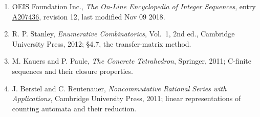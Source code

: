 \documentclass[11pt]{article}
\theoremstyle{definition}
\begin{document}
\begin{enumerate}

\item OEIS Foundation Inc., \emph{The On-Line Encyclopedia of Integer Sequences}, entry \href{https://oeis.org/A207436}{A207436}, revision 12, last modified Nov 09 2018.

\item R. P. Stanley, \emph{Enumerative Combinatorics}, Vol.~1, 2nd ed., Cambridge University Press, 2012; \S4.7, the transfer-matrix method.

\item M. Kauers and P. Paule, \emph{The Concrete Tetrahedron}, Springer, 2011; C-finite sequences and their closure properties.

\item J. Berstel and C. Reutenauer, \emph{Noncommutative Rational Series with Applications}, Cambridge University Press, 2011; linear representations of counting automata and their reduction.

\end{enumerate}
\end{document}
